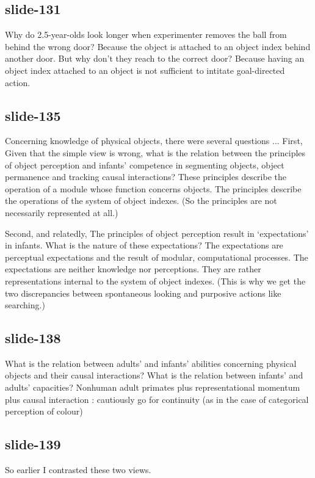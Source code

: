 \documentclass[12pt,\papersize]{extarticle}
\begin{document}
\subsection{slide-131}
Why do 2.5-year-olds look longer when experimenter removes the ball from behind the wrong 
door?  Because the object is attached to an object index behind another door.
But why don't they reach to the correct door?
Because having an object index attached to an object is not sufficient to intitate 
goal-directed action.
 
\subsection{slide-135}
Concerning knowledge of physical objects, there were several questions ...
First, Given that the simple view is wrong, what is the relation between the principles of object perception and infants’ competence in segmenting objects, object permanence and tracking causal interactions?
These principles describe the operation of a module whose function concerns objects.
The principles describe the operations of the system of object indexes.
(So the principles are not necessarily represented at all.)
 
Second, and relatedly, The principles of object perception result in ‘expectations’ in infants.  What is the nature of these expectations?
The expectations are perceptual expectations and the result of modular, computational processes.
The expectations are neither knowledge nor perceptions.
They are rather representations internal to the system of object indexes.
(This is why we get the two discrepancies between spontaneous looking and purposive actions 
like searching.)
 
\subsection{slide-138}
What is the relation between adults’ and infants’ abilities concerning physical objects and their causal interactions?
What is the relation between infants' and adults' capacities?  
Nonhuman adult primates plus representational momentum plus causal interaction : 
cautiously go for continuity (as in the case of categorical perception of colour)
 
\subsection{slide-139}
So earlier I contrasted these two views.
 
\end{document}
